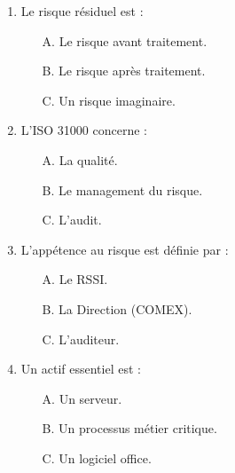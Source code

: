\begin{enumerate}
    \item Le risque résiduel est :
    \begin{itemize} \item[A.] Le risque avant traitement. \item[B.] Le risque après traitement. \item[C.] Un risque imaginaire. \end{itemize}
    \item L'ISO 31000 concerne :
    \begin{itemize} \item[A.] La qualité. \item[B.] Le management du risque. \item[C.] L'audit. \end{itemize}
    \item L'appétence au risque est définie par :
    \begin{itemize} \item[A.] Le RSSI. \item[B.] La Direction (COMEX). \item[C.] L'auditeur. \end{itemize}
    \item Un actif essentiel est :
    \begin{itemize} \item[A.] Un serveur. \item[B.] Un processus métier critique. \item[C.] Un logiciel office. \end{itemize}
\end{enumerate}

